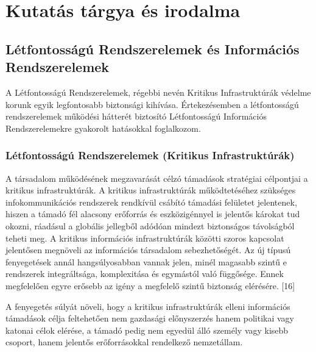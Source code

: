 \documentclass[12pt,magyar,a4paper,oneside]{scrreprt}
\begin{document}
\hypertarget{kutatuxe1s-tuxe1rgya-uxe9s-irodalma}{%
\chapter{Kutatás tárgya és
irodalma}\label{kutatuxe1s-tuxe1rgya-uxe9s-irodalma}}

\hypertarget{luxe9tfontossuxe1guxfa-rendszerelemek-uxe9s-informuxe1ciuxf3s-rendszerelemek}{%
\section{Létfontosságú Rendszerelemek és Információs
Rendszerelemek}\label{luxe9tfontossuxe1guxfa-rendszerelemek-uxe9s-informuxe1ciuxf3s-rendszerelemek}}

A Létfontosságú Rendszerelemek, régebbi nevén Kritikus Infrastruktúrák
védelme korunk egyik legfontosabb biztonsági kihívása. Értekezésemben a
létfontosságú rendszerelemek működési hátterét biztosító Létfontosságú
Információs Rendszerelemekre gyakorolt hatásokkal foglalkozom.

\hypertarget{luxe9tfontossuxe1guxfa-rendszerelemek-kritikus-infrastruktuxfaruxe1k}{%
\subsection{Létfontosságú Rendszerelemek (Kritikus
Infrastruktúrák)}\label{luxe9tfontossuxe1guxfa-rendszerelemek-kritikus-infrastruktuxfaruxe1k}}

A társadalom működésének megzavarását célzó támadások stratégiai
célpontjai a kritikus infrastruktúrák. A kritikus infrastruktúrák
működtetéséhez szükséges infokommunikációs rendszerek rendkívül csábító
támadási felületet jelentenek, hiszen a támadó fél alacsony erőforrás és
eszközigénnyel is jelentős károkat tud okozni, ráadásul a globális
jellegből adódóan mindezt biztonságos távolságból teheti meg. A kritikus
információs infrastruktúrák közötti szoros kapcsolat jelentősen
megnöveli az információs társadalom sebezhetőségét. Az új típusú
fenyegetések annál hangsúlyosabban vannak jelen, minél magasabb szintű e
rendszerek integráltsága, komplexitása és egymástól való függősége.
Ennek megfelelően egyre erősebb az igény a megfelelő szintű biztonság
elérésére. {[}16{]}

A fenyegetés súlyát növeli, hogy a kritikus infrastruktúrák elleni
információs támadások célja feltehetően nem gazdasági előnyszerzés hanem
politikai vagy katonai célok elérése, a támadó pedig nem egyedül álló
személy vagy kisebb csoport, hanem jelentős erőforrásokkal rendelkező
nemzetállam.
\end{document}
